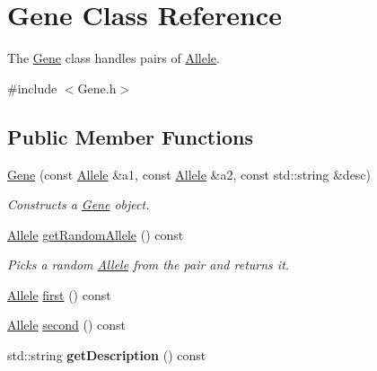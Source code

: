 \hypertarget{class_gene}{}\section{Gene Class Reference}
\label{class_gene}


The \hyperlink{class_gene}{Gene} class handles pairs of \hyperlink{class_allele}{Allele}.  




{\ttfamily \#include $<$Gene.\+h$>$}

\subsection*{Public Member Functions}
\begin{DoxyCompactItemize}
\item 
\hyperlink{class_gene_a3e8f531d014dd6aa2cfb25c7fed5ae5d}{Gene} (const \hyperlink{class_allele}{Allele} \&a1, const \hyperlink{class_allele}{Allele} \&a2, const std\+::string \&desc)
\begin{DoxyCompactList}\small\item\em Constructs a \hyperlink{class_gene}{Gene} object. \end{DoxyCompactList}\item 
\hyperlink{class_allele}{Allele} \hyperlink{class_gene_a7b631b7a53729db7523430049c89e463}{get\+Random\+Allele} () const 
\begin{DoxyCompactList}\small\item\em Picks a random \hyperlink{class_allele}{Allele} from the pair and returns it. \end{DoxyCompactList}\item 
\hyperlink{class_allele}{Allele} \hyperlink{class_gene_a935e5f290b1e66b970ed8b52a97b1ae9}{first} () const 
\item 
\hyperlink{class_allele}{Allele} \hyperlink{class_gene_a7c744b5c6e8d305c47c1563cc0e2acc8}{second} () const 
\item 
\hypertarget{class_gene_ad25e29f23ead79aa820a6df83ce37f21}{}std\+::string {\bfseries get\+Description} () const \label{class_gene_ad25e29f23ead79aa820a6df83ce37f21}


\end{DoxyCompactItemize}
